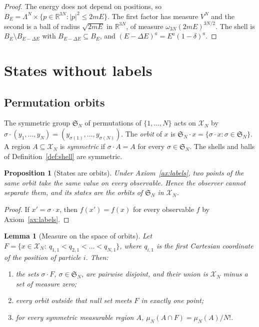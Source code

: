 \documentclass[11pt,a4paper]{article}
\newtheorem{proposition}[theorem]{Proposition}
\newtheorem{lemma}[theorem]{Lemma}
\theoremstyle{definition}
\theoremstyle{remark}
\newcommand{\R}{\mathbb{R}}
\newcommand{\X}{\mathcal{X}}
\newcommand{\Sym}{\mathfrak{S}}
\begin{document}
\begin{proof}
The energy does not depend on positions, so $B_E=\Lambda^{N}\times\{p\in\R^{3N}:|p|^{2}\le2mE\}$.
The first factor has measure $V^{N}$ and the second is a ball of radius $\sqrt{2mE}$ in $\R^{3N}$, of measure $\omega_{3N}(2mE)^{3N/2}$.
The shell is $B_E\setminus B_{E-\Delta E}$ with $B_{E-\Delta E}\subseteq B_E$, and $(E-\Delta E)^{a}=E^{a}(1-\delta)^{a}$.
\end{proof}

\section{States without labels}
\label{sec:labels}

\subsection{Permutation orbits}

The symmetric group $\Sym_N$ of permutations of $\{1,\dots,N\}$ acts on $\X_N$ by $\sigma\cdot(y_1,\dots,y_N)=(y_{\sigma(1)},\dots,y_{\sigma(N)})$.
The \emph{orbit} of $x$ is $\Sym_N\cdot x=\{\sigma\cdot x:\sigma\in\Sym_N\}$.
A region $A\subseteq\X_N$ is \emph{symmetric} if $\sigma\cdot A=A$ for every $\sigma\in\Sym_N$.
The shells and balls of Definition~\ref{def:shell} are symmetric.

\begin{proposition}[States are orbits]
\label{prop:orbits}
Under Axiom~\ref{ax:labels}, two points of the same orbit take the same value on every observable.
Hence the observer cannot separate them, and its states are the orbits of $\Sym_N$ in $\X_N$.
\end{proposition}

\begin{proof}
If $x'=\sigma\cdot x$, then $f(x')=f(x)$ for every observable $f$ by Axiom~\ref{ax:labels}.
\end{proof}

\begin{lemma}[Measure on the space of orbits]
\label{lem:quotient}
Let $F=\{x\in\X_N:\ q_{1,1}<q_{2,1}<\dots<q_{N,1}\}$, where $q_{i,1}$ is the first Cartesian coordinate of the position of particle $i$.
Then:
\begin{enumerate}[label=(\roman*),leftmargin=2.2em]
\item the sets $\sigma\cdot F$, $\sigma\in\Sym_N$, are pairwise disjoint, and their union is $\X_N$ minus a set of measure zero;
\item every orbit outside that null set meets $F$ in exactly one point;
\item for every symmetric measurable region $A$, $\mu_N(A\cap F)=\mu_N(A)/N!$.
\end{enumerate}
\end{lemma}
\end{document}

